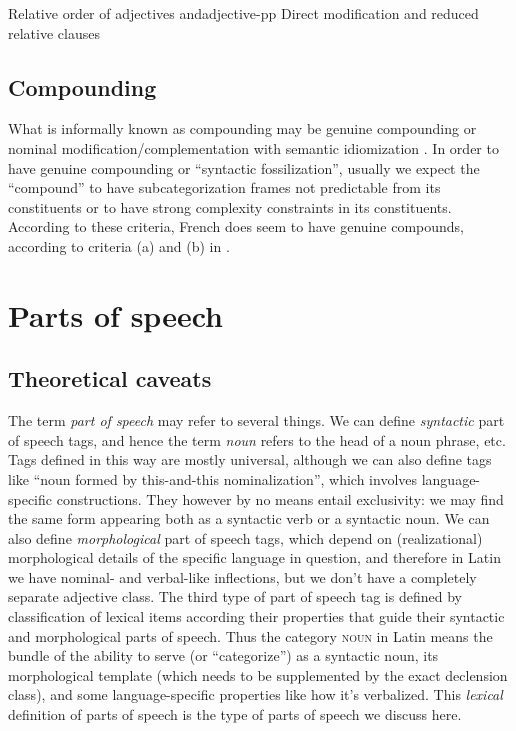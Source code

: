 \documentclass[a4paper, oneside, 12pt]{report}
\newcommand*{\citesec}[1]{\S~{#1}}
\newcommand*{\citechap}[1]{chap.~{#1}}
\newcommand*{\citepage}[1]{p.~{#1}}
\newcommand*{\term}[1]{\emph{#1}}
\newcommand*{\category}[1]{\textsc{#1}}
\begin{document}
\begin{todobox}{Relative order of adjectives and}{adjective-pp}
    Direct modification and reduced relative clauses
\end{todobox}

\subsection{Compounding}\label{sec:grammatical.np.compound}

What is informally known as compounding may be 
genuine compounding or nominal modification/complementation with semantic idiomization
\citep[\citechap{5}, \citesec{14.4}]{cgel}.
In order to have genuine compounding or ``syntactic fossilization'',
usually we expect the ``compound'' to have subcategorization frames
not predictable from its constituents
or to have strong complexity constraints in its constituents.
According to these criteria, French does seem to have genuine compounds,
according to criteria (a) and (b) in \citet[\citepage{15}]{rowlett2007syntax}.

\section{Parts of speech}

\subsection{Theoretical caveats}\label{sec:grammatical.pos.theory}

The term \term{part of speech} may refer to several things.
We can define \emph{syntactic} part of speech tags,
and hence the term \term{noun} refers to the head of a noun phrase, etc.
Tags defined in this way are mostly universal,
although we can also define tags like ``noun formed by this-and-this nominalization'',
which involves language-specific constructions.
They however by no means entail exclusivity:
we may find the same form appearing both as a syntactic verb or a syntactic noun.
We can also define \emph{morphological} part of speech tags,
which depend on (realizational) morphological details of the specific language in question,
and therefore in Latin we have nominal- and verbal-like inflections,
but we don't have a completely separate adjective class.
The third type of part of speech tag is defined by classification of lexical items
according their properties that guide their syntactic and morphological parts of speech.
Thus the category \category{noun} in Latin means the bundle of 
the ability to serve (or ``categorize'') as a syntactic noun, its morphological template
(which needs to be supplemented by the exact declension class),
and some language-specific properties like how it's verbalized.
This \emph{lexical} definition of parts of speech is the type of parts of speech we discuss here.
\end{document}
